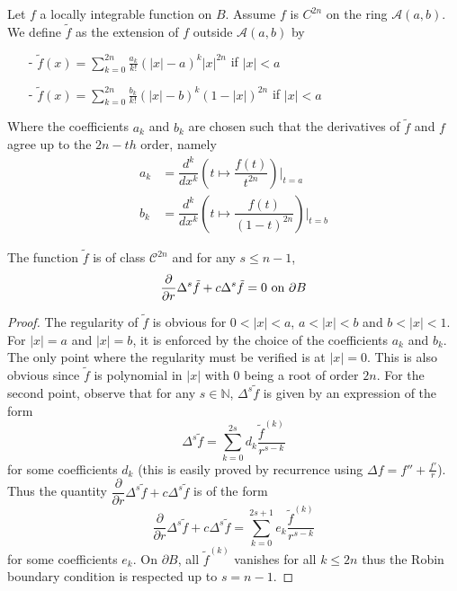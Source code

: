 \documentclass[11pt,a4paper]{article}
\begin{document}
\begin{Def} Let $f$ a locally integrable function on $B$. Assume $f$ is $C^{2n}$ on the ring $\mathcal{A}(a,b)$. We define $\tilde{f}$ as the extension of $f$ outside $\mathcal{A}(a,b)$ by 
\begin{itemize}
\item[-] $\tilde{f}(x) = \displaystyle\sum_{k=0}^{2n} \frac{a_k}{k!}(|x|-a)^{k}|x|^{2n}$ if $|x|<a$
\item[-] $\tilde{f}(x) = \displaystyle\sum_{k=0}^{2n} \frac{b_k}{k!}(|x|-b)^{k}\left(1-|x|\right)^{2n}$ if $|x|<a$
\end{itemize}

Where the coefficients $a_k$ and $b_k$ are chosen such that the derivatives of $\tilde{f}$ and $f$ agree up to the $2n-th$ order, namely 
\[ \begin{array}{rl}
a_k  &= \dfrac{d^k }{dx^k}\left(t\mapsto \dfrac{f(t)}{t^{2n}}\right)\Bigr|_{t=a}\\
b_k &= \dfrac{d^k }{dx^k}\left(t\mapsto \dfrac{f(t)}{(1-t)^{2n}}\right)\Bigr|_{t=b}
\end{array}\] 
\label{ProlongementDef}
\end{Def}

\begin{Prop} The function $\tilde{f}$ is of class $\mathcal{C}^{2n}$ and for any $s \leq n-1$, \[\dfrac{\partial}{\partial r}\Delta^s \tilde{f} + c \Delta^s \tilde{f} = 0 \textup{ on } \partial B\]
\begin{proof}
The regularity of $\tilde{f}$ is obvious for $0<|x|<a$, $a<|x|<b$ and $b<|x|<1$. For $|x| = a$ and $|x| = b$, it is enforced by the choice of the coefficients $a_k$ and $b_k$. The only point where the regularity must be verified is at $|x| = 0$. This is also obvious since $\tilde{f}$ is polynomial in $|x|$ with $0$ being a root of order $2n$. 
For the second point, observe that for any $s  \in \mathbb{N}$, $\Delta^s \tilde{f}$ is given by an expression of the form 
\[\Delta^s \tilde{f} = \sum_{k=0}^{2s} d_k\dfrac{\tilde{f}^{(k)}}{r^{s-k}}\]
for some coefficients $d_k$ (this is easily proved by recurrence using $\Delta f = f'' + \frac{f'}{r}$). Thus the quantity $\dfrac{\partial}{\partial r}\Delta^s \tilde{f} + c \Delta^s \tilde{f}$ is of the form 
\[\dfrac{\partial}{\partial r}\Delta^s \tilde{f} + c \Delta^s \tilde{f} = \sum_{k=0}^{2s+1} e_k\dfrac{\tilde{f}^{(k)}}{r^{s-k}}\] for some coefficients $e_k$. On $\partial B$, all $\tilde{f}^{(k)}$ vanishes for all $k \leq 2n$ thus the Robin boundary condition is respected up to $s=n-1$. 
\end{proof}
\end{Prop}
\end{document}
